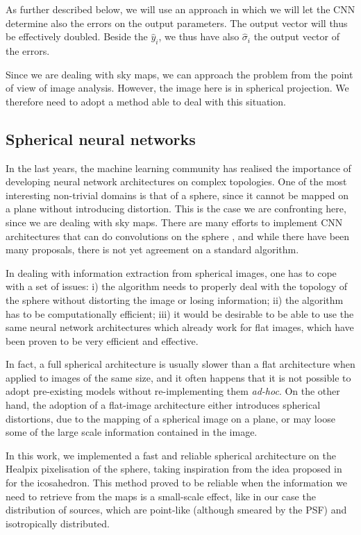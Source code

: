\documentclass[a4paper,11pt]{article}
\begin{document}
As further described below, we will use an approach in which we will let the CNN determine also the errors on the output parameters. The output vector will thus be effectively doubled. Beside the ${\hat y}_i$, we thus have also $\hat{\sigma}_i$ the output vector of the errors. 


Since we are dealing with sky maps, we can approach the problem from the point of view of image analysis. However, the image here is in spherical projection. We therefore need to adopt a method able to deal with this situation.


\subsection{Spherical neural networks}
In the last years, the machine learning community has realised the importance of developing neural network architectures on complex topologies. One of the most interesting non-trivial domains is that of a sphere, since it cannot be mapped on a plane without introducing distortion. This is the case we are confronting here, since we are dealing with sky maps.  There are many efforts to implement CNN architectures that can do convolutions on the sphere \cite{DBLP:journals/corr/abs-1708-00919,DBLP:journals/corr/abs-1902-04615,DBLP:journals/corr/abs-2012-15000,Krachmalnicoff:2019,mapped-convolutions}, and while there have been many proposals, there is not yet agreement on a standard algorithm.

In dealing with information extraction from spherical images, one has to cope with a set of issues: 
i) the algorithm needs to properly deal with the topology of the sphere without distorting the image or losing information;
ii) the algorithm has to be computationally efficient;
iii) it would be desirable to be able to use the same neural network architectures which already work for flat images, which have been proven to be very efficient and effective.

In fact, a full spherical architecture is usually slower than a flat architecture when applied to images of the same size, and it often happens that it is not possible to adopt pre-existing models without re-implementing them \textit{ad-hoc}. 
On the other hand, the adoption of a flat-image architecture either introduces spherical distortions, due to the mapping of a spherical image on a plane, or may loose some of the large scale information contained in the image.

In this work, we  implemented a fast and reliable spherical architecture on the Healpix pixelisation of the sphere, taking inspiration from the idea proposed in \cite{mapped-convolutions} for the icosahedron. This method proved to be reliable when the information we need to retrieve from the maps is a small-scale effect, like in our case the distribution of sources, which are point-like (although smeared by the PSF) and isotropically distributed.
\end{document}
